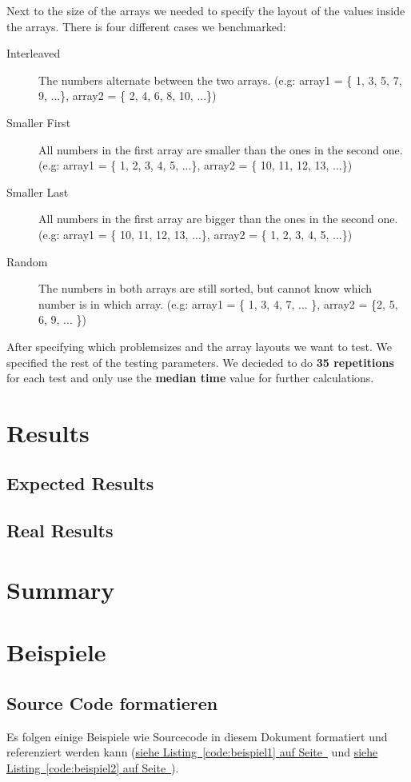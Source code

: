 \documentclass[12pt,a4paper,titlepage,oneside]{scrartcl}
\begin{document}
Next to the size of the arrays we needed to specify the layout of the values inside the arrays.
There is four different cases we benchmarked:

\begin{description}
\item[Interleaved] The numbers alternate between the two arrays. (e.g: array1 = \{ 1, 3, 5, 7, 9, ...\}, array2 = \{ 2, 4, 6, 8, 10, ...\})
\item[Smaller First] All numbers in the first array are smaller than the ones in the second one. (e.g: array1 = \{ 1, 2, 3, 4, 5, ...\}, array2 = \{ 10, 11, 12, 13, ...\})
\item[Smaller Last] All numbers in the first array are bigger than the ones in the second one.  (e.g: array1 = \{ 10, 11, 12, 13, ...\}, array2 = \{ 1, 2, 3, 4, 5, ...\})
\item[Random] The numbers in both arrays are still sorted, but cannot know which number is in which array. (e.g: array1 = \{ 1, 3, 4, 7, ... \}, array2 = \{2, 5, 6, 9, ... \})
\end{description}

After specifying which problemsizes and the array layouts we want to test. We specified the rest of the testing parameters. We decieded to do \textbf{35 repetitions} for each test and only use the \textbf{median time} value for further calculations.

\section{Results}


\subsection{Expected Results}

\subsection{Real Results}


\section{Summary}


\section{Beispiele}
\subsection{Source Code formatieren}
Es folgen einige Beispiele wie Sourcecode in diesem Dokument formatiert und referenziert werden kann
(\hyperref[code:beispiel1]{siehe Listing~\ref*{code:beispiel1} auf Seite~\pageref*{code:beispiel1}} und \hyperref[code:beispiel2]{siehe Listing~\ref*{code:beispiel2} auf Seite~\pageref*{code:beispiel2}}).
\end{document}
